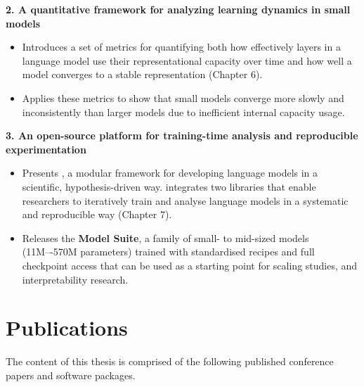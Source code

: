 \textbf{2. A quantitative framework for analyzing learning dynamics in small models}

\begin{itemize}
    \item Introduces a set of metrics for quantifying both how effectively layers in a language model use their representational capacity over time and how well a model converges to a stable representation (Chapter 6).

    \item Applies these metrics to show that small models converge more slowly and inconsistently than larger models due to inefficient internal capacity usage.

\end{itemize}

\textbf{3. An open-source platform for training-time analysis and reproducible experimentation}
\begin{itemize}
    \item Presents \textbf{\pico}, a modular framework for developing language models in a scientific, hypothesis-driven way. \pico integrates two libraries that enable researchers to iteratively train and analyse language models in a systematic and reproducible way (Chapter 7).

    \item Releases the \textbf{\pico Model Suite}, a family of small- to mid-sized models (11M–-570M parameters) trained with standardised recipes and full checkpoint access that can be used as a starting point for scaling studies, and interpretability research.
\end{itemize}

\newpage
\section*{Publications}

The content of this thesis is comprised of the following published conference papers and software packages.

